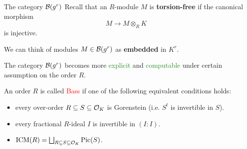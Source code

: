 \documentclass[usenames,dvipsnames]{beamer}
\newcommand{\red}[1]{\textcolor{red}{#1}}
\newcommand{\green}[1]{\textcolor{ForestGreen}{#1}}
\begin{document}
\begin{frame}{ The category ${\mathcal B}(g^r)$ }
Recall that an $R$-module $M$ is \textbf{torsion-free} if the canonical morphism
\[ M \to M\otimes_R K \]
is injective.

\pause We can think of modules $M\in {\mathcal B}(g^r)$ as \textbf{embedded} in $K^r$.

\pause The category ${\mathcal B}(g^r)$ becomes more \green{explicit} and \green{computable} under certain assumption on the order $R$.

An order $R$ is called \red{Bass} if one of the following equivalent conditions holds:
\begin{itemize}
 \pause \item every over-order $R\subseteq S \subseteq {\mathcal O}_K$ is Gorenstein (i.e. $S^t$ is invertible in $S$).
 \pause \item every fractional $R$-ideal $I$ is invertible in $(I:I)$.
 \pause \item $\operatorname{ICM}(R) = \bigsqcup_{R\subseteq S\subseteq {\mathcal O}_K} \operatorname{Pic}(S)$.
\end{itemize}
\end{frame}

\end{document}
